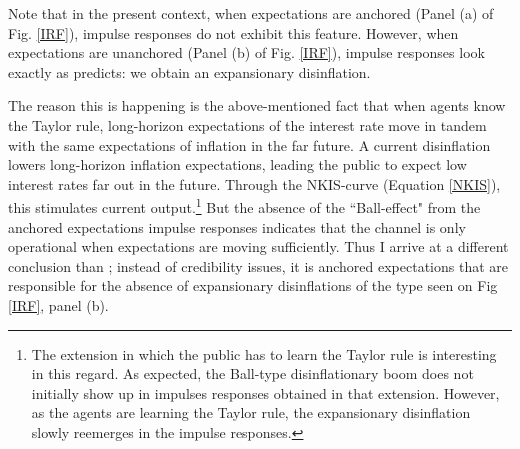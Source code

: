 \documentclass[11pt]{article}
\renewcommand{\[}{\begin{equation}}
\renewcommand{\]}{\end{equation}}
\begin{document}
Note that in the present context, when expectations are anchored (Panel (a) of Fig. \ref{IRF}), impulse responses do not exhibit this feature. However, when expectations are unanchored (Panel (b) of Fig. \ref{IRF}), impulse responses look exactly as \cite{ball1994credible} predicts: we obtain an expansionary disinflation. 

The reason this is happening is the above-mentioned fact that when agents know the Taylor rule, long-horizon expectations of the interest rate move in tandem with the same expectations of inflation in the far future. A current disinflation lowers long-horizon inflation expectations, leading the public to expect low interest rates far out in the future. Through the NKIS-curve (Equation \ref{NKIS}), this stimulates current output.\footnote{The extension in which the public has to learn the Taylor rule is interesting in this regard. As expected, the Ball-type disinflationary boom does not initially show up in impulses responses obtained in that extension. However, as the agents are learning the Taylor rule, the expansionary disinflation slowly reemerges in the impulse responses.} But the absence of the ``Ball-effect" from the anchored expectations impulse responses indicates that the channel is only operational when expectations are moving sufficiently. Thus I arrive at a different conclusion than \cite{ball1994credible}; instead of credibility issues, it is anchored expectations that are responsible for the absence of expansionary disinflations of the type seen on Fig \ref{IRF}, panel (b).
\end{document}
